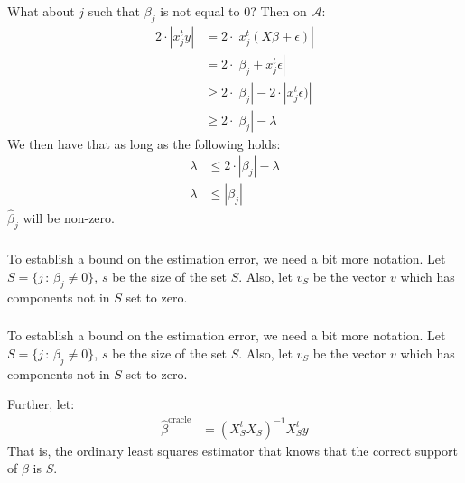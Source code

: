 \begin{frame}[fragile] \frametitle{}

What about $j$ such that $\beta_j$ is not equal to $0$? \pause Then
on $\mathcal{A}$:
\begin{align*}
2 \cdot|x_j^t y| &= 2 \cdot|x_j^t (X \beta + \epsilon) | \\
&= 2 \cdot |\beta_j + x_j^t \epsilon | \\
&\geq 2 \cdot | \beta_j | - 2 \cdot |x_j^t \epsilon) | \\
&\geq 2 \cdot | \beta_j | - \lambda
\end{align*}
\pause We then have that as long as the following holds:
\begin{align*}
\lambda &\leq 2 \cdot | \beta_j | - \lambda \\
\lambda &\leq | \beta_j |
\end{align*}
$\widehat{\beta}_j$ will be non-zero.

\end{frame}

\begin{frame}[fragile] \frametitle{}

To establish a bound on the estimation error, we need a bit
more notation. Let $S = \{j \, : \, \beta_j \neq 0\}$, $s$
be the size of the set $S$. Also, let $v_{S}$ be the vector
$v$ which has components not in $S$ set to zero.

\end{frame}

\begin{frame}[fragile] \frametitle{}

To establish a bound on the estimation error, we need a bit
more notation. Let $S = \{j \, : \, \beta_j \neq 0\}$, $s$
be the size of the set $S$. Also, let $v_{S}$ be the vector
$v$ which has components not in $S$ set to zero.

\pause Further, let:
\begin{align*}
\widehat{\beta}^{\text{oracle}} &= (X^t_S X_S)^{-1} X^t_S y
\end{align*}
That is, the ordinary least squares estimator that knows that
the correct support of $\beta$ is $S$.

\end{frame}

